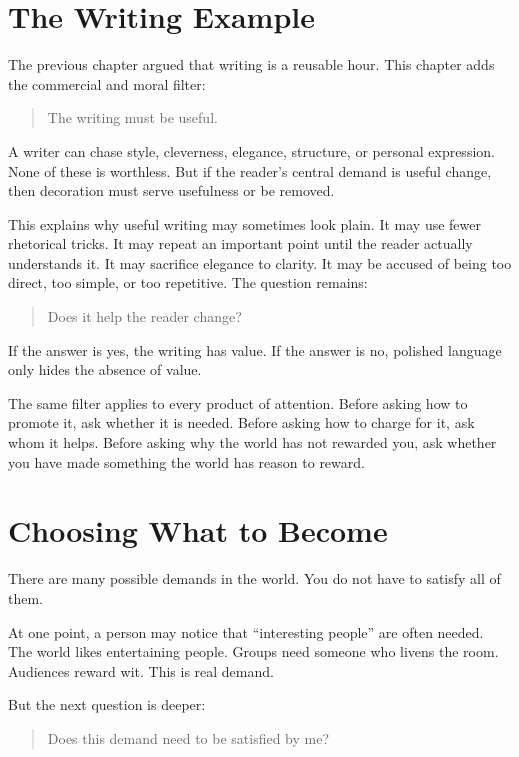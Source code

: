 \section*{The Writing Example}

The previous chapter argued that writing is a reusable hour. This chapter adds the commercial and moral filter:

\begin{quote}
The writing must be useful.
\end{quote}

A writer can chase style, cleverness, elegance, structure, or personal expression. None of these is worthless. But if the reader's central demand is useful change, then decoration must serve usefulness or be removed.

This explains why useful writing may sometimes look plain. It may use fewer rhetorical tricks. It may repeat an important point until the reader actually understands it. It may sacrifice elegance to clarity. It may be accused of being too direct, too simple, or too repetitive. The question remains:

\begin{quote}
Does it help the reader change?
\end{quote}

If the answer is yes, the writing has value. If the answer is no, polished language only hides the absence of value.

The same filter applies to every product of attention. Before asking how to promote it, ask whether it is needed. Before asking how to charge for it, ask whom it helps. Before asking why the world has not rewarded you, ask whether you have made something the world has reason to reward.

\section*{Choosing What to Become}

There are many possible demands in the world. You do not have to satisfy all of them.

At one point, a person may notice that ``interesting people'' are often needed. The world likes entertaining people. Groups need someone who livens the room. Audiences reward wit. This is real demand.

But the next question is deeper:

\begin{quote}
Does this demand need to be satisfied by me?
\end{quote}

